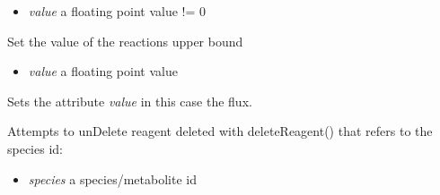 \documentclass[a4paper,11pt,english]{sphinxmanual}
\begin{document}
\begin{fulllineitems}
\begin{fulllineitems}
\begin{itemize}
\item {} 
\emph{value} a floating point value != 0

\end{itemize}

\end{fulllineitems}


\begin{fulllineitems}
\label{modules_doc:cbmpy.CBModel.Reaction.setUpperBound}
Set the value of the reactions upper bound
\begin{itemize}
\item {} 
\emph{value} a floating point value

\end{itemize}

\end{fulllineitems}


\begin{fulllineitems}
\label{modules_doc:cbmpy.CBModel.Reaction.setValue}
Sets the attribute \emph{value} in this case the flux.

\end{fulllineitems}


\begin{fulllineitems}
\label{modules_doc:cbmpy.CBModel.Reaction.undeleteReagentWithSpeciesRef}
Attempts to unDelete reagent deleted with deleteReagent() that refers to the species id:
\begin{itemize}
\item {} 
\emph{species} a species/metabolite id

\end{itemize}

\end{fulllineitems}


\end{fulllineitems}

\end{document}
